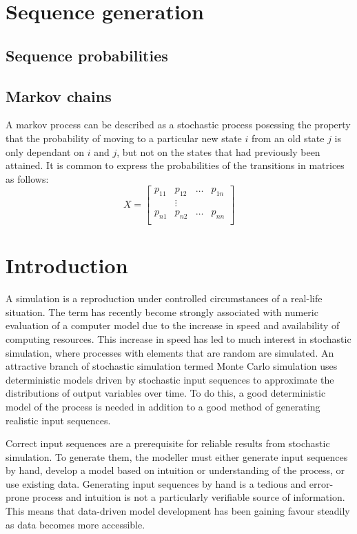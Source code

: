 \section{Sequence generation}
\subsection{Sequence probabilities}

\subsection{Markov chains}
A markov process can be described as a stochastic process posessing the
property that the probability of moving to a particular new state $i$ from an
old state $j$ is only dependant on $i$ and $j$, but not on the states that had
previously been attained.  It is common to express the probabilities of the
transitions in matrices as follows:
\begin{equation}
X = \left [ \begin{array}{cccc}
            p_{11} & p_{12}	& \ldots & p_{1n} \\
            & \vdots & \\
            p_{n1} & p_{n2} & \ldots & p_{nn}\\ 
            \end{array}\right]
\end{equation}

\section{Introduction}
A simulation is a reproduction under controlled circumstances of a
real-life situation.  The term has recently become strongly associated
with numeric evaluation of a computer model due to the increase in
speed and availability of computing resources.  This increase in speed
has led to much interest in stochastic simulation, where processes
with elements that are random are simulated.  An attractive branch of
stochastic simulation termed Monte Carlo simulation uses deterministic
models driven by stochastic input sequences to approximate the
distributions of output variables over time.  To do this, a good
deterministic model of the process is needed in addition to a good
method of generating realistic input sequences.

Correct input sequences are a prerequisite for reliable results from
stochastic simulation.  To generate them, the modeller must either
generate input sequences by hand, develop a model based on intuition
or understanding of the process, or use existing data.  Generating
input sequences by hand is a tedious and error-prone process and
intuition is not a particularly verifiable source of information.
This means that data-driven model development has been gaining favour
steadily as data becomes more accessible.


